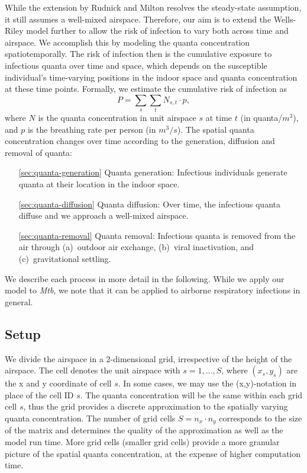 \documentclass[fleqn,11pt]{wlscirep_supp}
\begin{document}
While the extension by Rudnick and Milton resolves the steady-state assumption, it still assumes a well-mixed airspace. Therefore, our aim is to extend the Wells-Riley model further to allow the risk of infection to vary both across time and airspace. We accomplish this by modeling the quanta concentration spatiotemporally. The risk of infection then is the cumulative exposure to infectious quanta over time and space, which depends on the susceptible individual's time-varying positions in the indoor space and quanta concentration at these time points. Formally, we estimate the cumulative risk of infection as 
\begin{equation}
    P = \sum_s \sum_t N_{s,t} \cdot p,
\end{equation}
where $N$ is the quanta concentration in unit airspace $s$ at time $t$ (in quanta/$m^3$), and $p$ is the breathing rate per person (in $m^3/s$). The spatial quanta concentration changes over time according to the generation, diffusion and removal of quanta: 
\begin{itemize}
    \item[\ref{sec:quanta-generation}] Quanta generation: Infectious individuals generate quanta at their location in the indoor space. 
    \item[\ref{sec:quanta-diffusion}] Quanta diffusion: Over time, the infectious quanta diffuse and we approach a well-mixed airspace. 
    \item[\ref{sec:quanta-removal}] Quanta removal: Infectious quanta is removed from the air through (a)~outdoor air exchange, (b)~viral inactivation, and (c)~gravitational settling. 
\end{itemize}
We describe each process in more detail in the following. While we apply our model to \emph{Mtb}, we note that it can be applied to airborne respiratory infections in general.

\subsection{Setup}

We divide the airspace in a 2-dimensional grid, irrespective of the height of the airspace. The cell denotes the unit airspace with $s = 1, \dots, S$, where $(x_s, y_s)$ are the x and y coordinate of cell $s$. In some cases, we may use the (x,y)-notation in place of the cell ID $s$. The quanta concentration will be the same within each grid cell $s$, thus the grid provides a discrete approximation to the spatially varying quanta concentration. The number of grid cells $S = n_x \cdot n_y$ corresponds to the size of the matrix and determines the quality of the approximation as well as the model run time. More grid cells (smaller grid cells) provide a more granular picture of the spatial quanta concentration, at the expense of higher computation time. 
\end{document}
